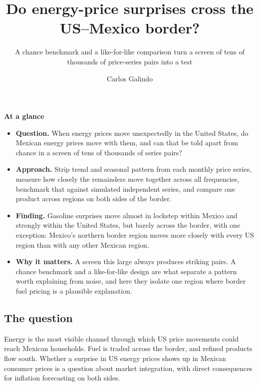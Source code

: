 \documentclass[
  british,
  a4paper,
]{article}
\title{Do energy-price surprises cross the US--Mexico border?}
\subtitle{A chance benchmark and a like-for-like comparison turn a
screen of tens of thousands of price-series pairs into a test}
\author{Carlos Galindo}
\date{}
\providecommand{\tightlist}{%
  \setlength{\itemsep}{0pt}\setlength{\parskip}{0pt}}
\begin{document}
\maketitle


\begin{tcolorbox}[enhanced jigsaw, arc=.35mm, bottomrule=.15mm, breakable, colback=white, colframe=quarto-callout-note-color-frame, left=2mm, leftrule=.75mm, opacityback=0, rightrule=.15mm, toprule=.15mm]

\vspace{-3mm}\textbf{At a glance}\vspace{3mm}

\begin{itemize}
\tightlist
\item
  \textbf{Question.} When energy prices move unexpectedly in the United
  States, do Mexican energy prices move with them, and can that be told
  apart from chance in a screen of tens of thousands of series pairs?
\item
  \textbf{Approach.} Strip trend and seasonal pattern from each monthly
  price series, measure how closely the remainders move together across
  all frequencies, benchmark that against simulated independent series,
  and compare one product across regions on both sides of the border.
\item
  \textbf{Finding.} Gasoline surprises move almost in lockstep within
  Mexico and strongly within the United States, but barely across the
  border, with one exception: Mexico's northern border region moves more
  closely with every US region than with any other Mexican region.
\item
  \textbf{Why it matters.} A screen this large always produces striking
  pairs. A chance benchmark and a like-for-like design are what separate
  a pattern worth explaining from noise, and here they isolate one
  region where border fuel pricing is a plausible explanation.
\end{itemize}

\end{tcolorbox}

\subsection{The question}\label{the-question}

Energy is the most visible channel through which US price movements
could reach Mexican households. Fuel is traded across the border, and
refined products flow south. Whether a surprise in US energy prices
shows up in Mexican consumer prices is a question about market
integration, with direct consequences for inflation forecasting on both
sides.
\end{document}
